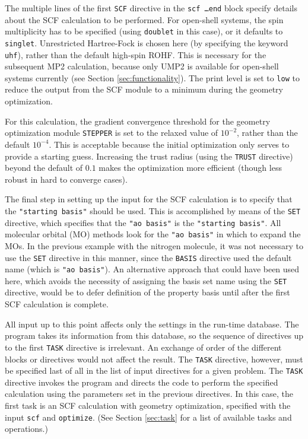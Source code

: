 The multiple lines of the first {\tt SCF} directive in the {\tt scf
  \ldots end} block specify details about the SCF calculation to be
performed.  For open-shell systems, the spin multiplicity has to be
specified (using {\tt doublet} in this case), or it defaults to {\tt
  singlet}.  Unrestricted Hartree-Fock is chosen here (by specifying
the keyword {\tt uhf}), rather than the default high-spin ROHF.  This
is necessary for the subsequent MP2 calculation, because only UMP2 is
available for open-shell systems currently (see Section
\ref{sec:functionality}).  The print level is set to {\tt low} to
reduce the output from the SCF module to a minimum during the geometry
optimization.

For this calculation, the gradient convergence threshold for the
geometry optimization module {\tt STEPPER} is set to the
relaxed value of $10^{-2}$, rather than the default $10^{-4}$.  This is
acceptable because the initial optimization only serves to provide a
starting guess.  Increasing the trust radius (using the \verb+TRUST+
directive) beyond the default of $0.1$ makes the optimization more
efficient (though less robust in hard to converge cases).

The final step in setting up the input for the SCF calculation is to
specify that the \verb+"starting basis"+ should be used.  This is
accomplished by means of the \verb+SET+ directive, which specifies that 
the \verb+"ao basis"+ is the \verb+"starting basis"+.  All molecular
orbital (MO) methods look for the \verb+"ao basis"+ in which to expand the
MOs.    In the previous example with the nitrogen molecule, it was not 
necessary to use the \verb+SET+ directive in this manner, since the 
\verb+BASIS+ directive used the default name (which is \verb+"ao basis"+).
An alternative approach that could have been used here, which avoids the 
necessity of assigning the basis set name using the
\verb+SET+ directive, would be to defer definition of the property basis
until after the first SCF calculation is complete. 

All input up to this point affects only the settings in the run-time
database.  The program takes its information from this database, so
the sequence of directives up to the first \verb+TASK+ directive is
irrelevant.  An exchange of order of the different blocks or
directives would not affect the result.  The {\tt TASK} directive,
however, must be specified last of all in the list of input directives
for a given problem.  The {\tt TASK} directive invokes the program and
directs the code to perform the specified calculation using the
parameters set in the previous directives. In this case, the first
task is an SCF calculation with geometry optimization, specified with
the input {\tt scf} and {\tt optimize}.  (See Section \ref{sec:task}
for a list of available tasks and operations.)


